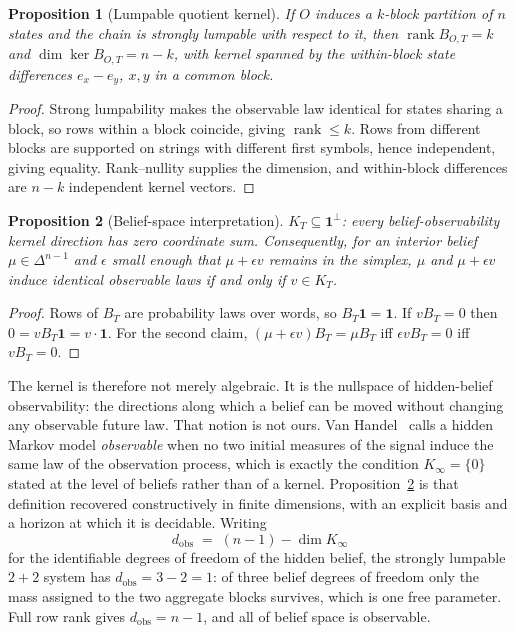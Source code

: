 \documentclass[11pt]{article}
\newtheorem{proposition}{Proposition}
\begin{document}
\begin{proposition}[Lumpable quotient kernel]\label{prop:lump}
If $O$ induces a $k$-block partition of $n$ states and the chain is strongly lumpable with
respect to it, then $\operatorname{rank} B_{O,T} = k$ and $\dim \ker B_{O,T} = n-k$, with
kernel spanned by the within-block state differences $e_x - e_y$, $x,y$ in a common block.
\end{proposition}
\begin{proof}
Strong lumpability makes the observable law identical for states sharing a block, so rows
within a block coincide, giving $\operatorname{rank} \le k$. Rows from different blocks are
supported on strings with different first symbols, hence independent, giving equality.
Rank--nullity supplies the dimension, and within-block differences are $n-k$ independent
kernel vectors.
\end{proof}

\begin{proposition}[Belief-space interpretation]\label{prop:belief}
$K_T \subseteq \mathbf{1}^\perp$: every belief-observability kernel direction has zero coordinate sum.
Consequently, for an interior belief $\mu \in \Delta^{n-1}$ and $\epsilon$ small enough
that $\mu + \epsilon v$ remains in the simplex, $\mu$ and $\mu + \epsilon v$ induce
identical observable laws if and only if $v \in K_T$.
\end{proposition}
\begin{proof}
Rows of $B_T$ are probability laws over words, so $B_T \mathbf{1} = \mathbf{1}$. If
$vB_T = 0$ then $0 = vB_T\mathbf{1} = v\cdot\mathbf{1}$. For the second claim,
$(\mu + \epsilon v)B_T = \mu B_T$ iff $\epsilon v B_T = 0$ iff $vB_T = 0$.
\end{proof}

The kernel is therefore not merely algebraic. It is the nullspace of hidden-belief
observability: the directions along which a belief can be moved without changing any
observable future law. That notion is not ours. Van Handel~\cite{vanhandel2009} calls a
hidden Markov model \emph{observable} when no two initial measures of the signal induce the
same law of the observation process, which is exactly the condition $K_\infty = \{0\}$
stated at the level of beliefs rather than of a kernel. Proposition~\ref{prop:belief} is
that definition recovered constructively in finite dimensions, with an explicit basis and a
horizon at which it is decidable. Writing
\[
  d_{\mathrm{obs}} \;=\; (n-1) - \dim K_\infty
\]
for the identifiable degrees of freedom of the hidden belief, the strongly lumpable
$2{+}2$ system has $d_{\mathrm{obs}} = 3 - 2 = 1$: of three belief degrees of freedom only
the mass assigned to the two aggregate blocks survives, which is one free parameter. Full
row rank gives $d_{\mathrm{obs}} = n-1$, and all of belief space is observable.
\end{document}
